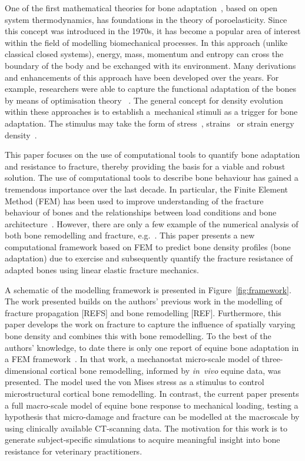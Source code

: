\documentclass[review]{elsarticle}
\numberwithin{equation}{section}
\begin{document}
One of the first mathematical theories for bone adaptation~\citep{cowin1976bone}, based on open system thermodynamics, has foundations in the theory of poroelasticity. 
Since this concept was introduced in the 1970s, it has become a popular area of interest within the field of modelling biomechanical processes. 
In this approach (unlike classical closed systems), energy, mass, momentum and entropy can cross the boundary of the body and 
be exchanged with its environment. 
Many derivations and enhancements of this approach have been developed over the years. 
For example, researchers were able to capture the functional adaptation of the bones by means of optimisation theory
~\citep{harrigan1996bone, jacobs1995numerical, weinans1992behavior}.
The general concept for density evolution within these approaches is to establish a~mechanical stimuli as a trigger for bone adaptation. 
The stimulus may take the form of stress~\citep{beaupre1990approach, carter1996mechanical, doblare2002anisotropic}, strains~\citep{cowin1976bone} or strain energy density~\citep{weinans1992behavior, kuhl2003theory,kaczmarczyk2011efficient, Connor2017bone}. 

This paper focuses on the use of computational tools to quantify bone adaptation and resistance to fracture, thereby providing the basis for a 
viable and robust solution.
The use of computational tools to describe bone behaviour has gained a tremendous importance over the last decade. 
In particular, the Finite Element Method (FEM) has been used to improve understanding of the fracture behaviour of bones and the relationships between load conditions and bone architecture~\citep{podshivalov2014road, poelert2013patient}. However, there are only a few example of the numerical analysis of both bone remodelling and fracture, e.g.~\citep{hambli2013integrated}. This paper presents a new computational framework based on FEM to predict bone density profiles 
(bone adaptation) due to exercise and subsequently quantify the fracture resistance of 
adapted bones using linear elastic fracture mechanics. 

A schematic of the modelling framework is presented in Figure~\ref{fig:framework}. The work presented builds on the authors' previous work in the modelling of fracture propagation [REFS] and bone remodelling [REF]. Furthermore, this paper develops the work on fracture to capture the influence of spatially varying bone density and combines this with bone remodelling. 
To the best of the authors' knowledge, to date there is only one report of equine bone adaptation in a FEM framework~\citep{Wang2016}. 
In that work, a mechanostat micro-scale model of three-dimensional cortical bone remodelling, informed by \emph{in~vivo} equine data, was presented. 
The model used the von Mises stress as a stimulus to control microstructural cortical bone remodelling.
In contrast, the current paper presents a full macro-scale model of equine bone response to mechanical loading, testing a hypothesis that micro-damage and fracture can be modelled at the macroscale by using clinically available CT-scanning data.
The motivation for this work is to generate subject-specific simulations to acquire meaningful insight into bone resistance
 for veterinary practitioners.
\end{document}
